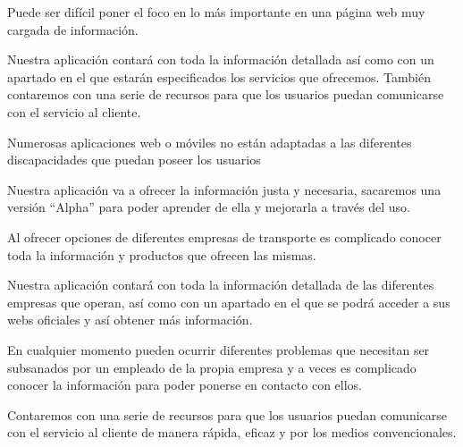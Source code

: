 \vspace{0.5cm}

\begin{problema}
    Puede ser difícil poner el foco en lo más importante en una página web muy cargada de información.

    {\centering
    \begin{vision}\justifying \noindent
        Nuestra aplicación contará con toda la información detallada así como con un apartado en el que estarán especificados los servicios que ofrecemos. También contaremos con una serie de recursos para que los usuarios puedan comunicarse con el servicio al cliente.
    \end{vision}}
\end{problema}


\vspace{0.5cm}

\begin{problema}

    Numerosas aplicaciones web o móviles no están adaptadas a las diferentes discapacidades que puedan poseer los usuarios
    
    {\centering
    \begin{vision}\justifying \noindent
        Nuestra aplicación va a ofrecer la información justa y necesaria, sacaremos una versión “Alpha” para poder aprender de ella y mejorarla a través del uso.
    \end{vision}}
\end{problema}


\vspace{0.5cm}

\begin{problema}

    Al ofrecer opciones de diferentes empresas de transporte es complicado conocer toda la información y productos que ofrecen las mismas.

    {\centering
    \begin{vision}\justifying \noindent
        Nuestra aplicación contará con toda la información detallada de las diferentes empresas que operan, así como con un apartado en el que se podrá acceder a sus webs oficiales y así obtener más información.    \end{vision}}
\end{problema}
    
\vspace{0.5cm}

\begin{problema}

    En cualquier momento pueden ocurrir diferentes problemas que necesitan ser subsanados por un empleado de la propia empresa y a veces es complicado conocer la información para poder ponerse en contacto con ellos.

    {\centering
    \begin{vision}\justifying \noindent
        Contaremos con una serie de recursos para que los usuarios puedan comunicarse con el servicio al cliente de manera rápida, eficaz y por los medios convencionales.
    \end{vision}}
\end{problema}

